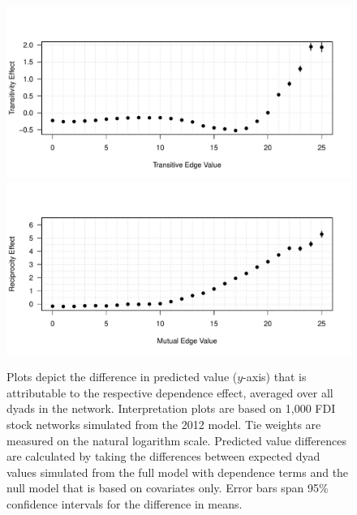 \documentclass[reqno,onecolumn,letterpaper,12pt]{article}
\begin{document}
\begin{figure}[!h]
\centering
\includegraphics[scale=.75]{figures/transitiveInterpretation.pdf} \vspace{-.5cm}\\
\includegraphics[scale=.75]{figures/mutualInterpretation.pdf} \vspace{-.5cm}
\caption{\label{fig:interpret} Plots depict the difference in predicted value ($y$-axis) that is attributable to the respective dependence effect, averaged over all dyads in the network. Interpretation plots are based on 1,000 FDI stock networks simulated from the 2012 model. Tie weights are measured on the natural logarithm scale. Predicted value differences are calculated by taking the differences between expected dyad values simulated from the full model with dependence terms and the null model that is based on covariates only. Error bars span 95\% confidence intervals for the difference in means. }
\end{figure}
\end{document}
